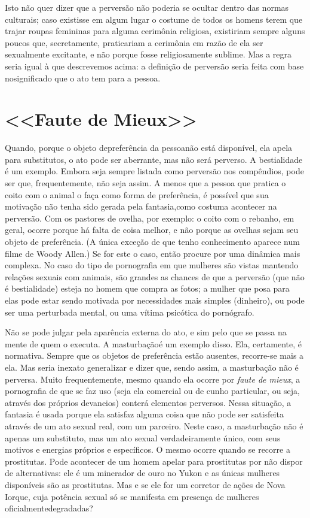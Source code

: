 Isto não quer dizer que a perversão não poderia se ocultar dentro
das normas culturais; caso existisse em algum lugar o costume de todos
os homens terem que trajar roupas femininas para alguma cerimônia
religiosa, existiriam sempre alguns poucos que, secretamente,
praticariam a cerimônia em razão de ela ser sexualmente excitante, e
não porque fosse religiosamente sublime. Mas a regra seria igual à que
descrevemos acima: a definição de perversão seria feita com base no\idxvariacult[|)]
significado que o ato tem para a pessoa.


\section{<<Faute de Mieux>>}

Quando, porque o objeto de\idxfaute[|(] preferência da pessoa\idxvariafaut[|(] não está
disponível, ela apela para substitutos, o ato pode ser aberrante, mas
não será perverso. A\idxpornobest{} bestialidade\idxbesta{} é um exemplo. Embora seja sempre
listada como perversão nos compêndios, pode ser que, frequentemente,
não seja assim. A menos que a pessoa que pratica o coito com o animal o
faça como forma de preferência, é possível que sua motivação não tenha
sido gerada pela fantasia,\idxfanta[|(] como costuma acontecer na perversão. Com os
pastores de ovelha, por exemplo: o coito com o rebanho, em geral,
ocorre porque há falta de coisa melhor, e não porque as ovelhas sejam
seu objeto de preferência. (A única exceção de que tenho conhecimento
aparece num filme de Woody Allen.) Se for este o caso, então procure
por uma dinâmica mais complexa. No caso do tipo de pornografia em que
mulheres são vistas mantendo relações sexuais com animais, são grandes
as chances de que a perversão (que não é bestialidade) esteja no homem
que compra as fotos; a mulher que posa para elas pode estar sendo
motivada por necessidades mais simples (dinheiro), ou pode ser uma
perturbada mental, ou uma vítima psicótica do pornógrafo.

Não se pode julgar pela aparência externa do ato, e sim pelo que se
passa na mente de quem o executa. A masturbação\idxmastur[|(] é um exemplo disso.
Ela, certamente, é normativa. Sempre que os objetos de preferência
estão ausentes, recorre-se mais a ela. Mas seria inexato generalizar e
dizer que, sendo assim, a masturbação\idxpornomast{} não é perversa. Muito
frequentemente, mesmo quando ela ocorre por \textit{faute de mieux}, a
pornografia de que se faz uso (seja ela comercial ou de cunho
particular, ou seja, através dos próprios devaneios) conterá elementos
perversos. Nessa situação, a fantasia é usada porque ela satisfaz
alguma coisa que não pode ser satisfeita através de um ato sexual real,
com um parceiro. Neste caso, a masturbação não é apenas um substituto,
mas um ato sexual verdadeiramente único, com seus motivos e energias
próprios e específicos. O mesmo ocorre quando se recorre a prostitutas.
Pode acontecer de um homem apelar para prostitutas por não dispor de
alternativas: ele é um minerador de ouro no Yukon e as únicas
mulheres disponíveis são as prostitutas. Mas e se ele for um corretor
de ações de Nova Iorque, cuja potência sexual só se manifesta em
presença de mulheres oficialmente\idxmastur[|)] degradadas?

